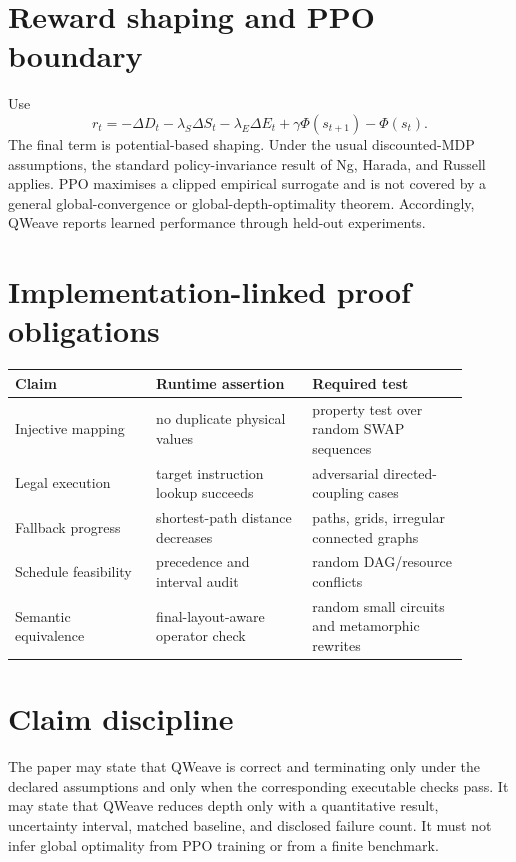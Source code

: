 \documentclass[11pt]{article}
\begin{document}
\section{Reward shaping and PPO boundary}
Use
\begin{equation}
r_t=-\Delta D_t-\lambda_S\Delta S_t-\lambda_E\Delta E_t+\gamma\Phi(s_{t+1})-\Phi(s_t).
\end{equation}
The final term is potential-based shaping. Under the usual discounted-MDP assumptions, the standard policy-invariance result of Ng, Harada, and Russell applies. PPO maximises a clipped empirical surrogate and is not covered by a general global-convergence or global-depth-optimality theorem. Accordingly, QWeave reports learned performance through held-out experiments.

\section{Implementation-linked proof obligations}
\begin{center}
\begin{tabular}{p{0.28\linewidth}p{0.31\linewidth}p{0.31\linewidth}}
\toprule
Claim & Runtime assertion & Required test\\
\midrule
Injective mapping & no duplicate physical values & property test over random SWAP sequences\\
Legal execution & target instruction lookup succeeds & adversarial directed-coupling cases\\
Fallback progress & shortest-path distance decreases & paths, grids, irregular connected graphs\\
Schedule feasibility & precedence and interval audit & random DAG/resource conflicts\\
Semantic equivalence & final-layout-aware operator check & random small circuits and metamorphic rewrites\\
\bottomrule
\end{tabular}
\end{center}

\section{Claim discipline}
The paper may state that QWeave is correct and terminating only under the declared assumptions and only when the corresponding executable checks pass. It may state that QWeave reduces depth only with a quantitative result, uncertainty interval, matched baseline, and disclosed failure count. It must not infer global optimality from PPO training or from a finite benchmark.
\end{document}
